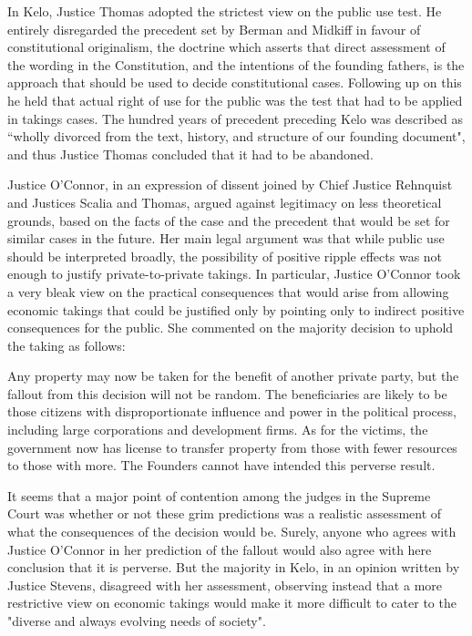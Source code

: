 In Kelo, Justice Thomas adopted the strictest view on the public use test. He entirely disregarded  the precedent set by Berman and Midkiff in favour of constitutional originalism, the doctrine which asserts that direct assessment of the wording in the Constitution, and the intentions of the founding fathers, is the approach that should be used to decide constitutional cases. Following up on this he held that actual right of use for the public was the test that had to be applied in takings cases. The hundred years of precedent preceding Kelo was described as “wholly divorced from the text, history, and structure of our founding document", and thus Justice Thomas concluded that it had to be abandoned. 

Justice O'Connor, in an expression of dissent joined by Chief Justice Rehnquist and Justices Scalia
and Thomas, argued against legitimacy on less theoretical grounds, based on the facts of the case and the precedent that would be set for similar cases in the future. Her main legal argument was that while public use should be interpreted broadly, the possibility of positive ripple effects was not enough to justify private-to-private takings. In particular, Justice O'Connor took a very bleak view on the practical consequences that would arise from allowing economic takings that could be justified only by pointing only to indirect positive consequences for the public. She commented on the majority decision to uphold the taking as follows: 

Any property may now be taken for the benefit of another private party, but the fallout from this decision will not be random. The beneficiaries are likely to be those citizens with disproportionate influence and power in the political process, including large corporations and development firms. As for the victims, the government now has license to transfer property from those with fewer resources to those with more. The Founders cannot have intended this perverse result.

It seems that a major point of contention among the judges in the Supreme Court was whether or not these grim predictions was a realistic assessment of what the consequences of the decision would be. Surely, anyone who agrees with Justice O'Connor in her prediction of the fallout would also agree with here conclusion that it is perverse. But the majority in Kelo, in an opinion written by Justice Stevens, disagreed with her assessment, observing instead that a more restrictive view on economic takings would make it more difficult to cater to the "diverse and always evolving needs of society". 


